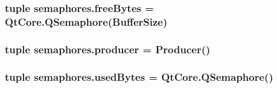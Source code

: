 \subsubsection[{free\+Bytes}]{\setlength{\rightskip}{0pt plus 5cm}tuple semaphores.\+free\+Bytes = Qt\+Core.\+Q\+Semaphore({\bf Buffer\+Size})}\label{namespacesemaphores_a00322f5648ba975dc23e9135233b5194}
\hypertarget{namespacesemaphores_aa6bae6efa5f3a5d078a36acb55002276}{}
\subsubsection[{producer}]{\setlength{\rightskip}{0pt plus 5cm}tuple semaphores.\+producer = {\bf Producer}()}\label{namespacesemaphores_aa6bae6efa5f3a5d078a36acb55002276}
\hypertarget{namespacesemaphores_a6ada4685bc431d22072f34ca03958454}{}
\subsubsection[{used\+Bytes}]{\setlength{\rightskip}{0pt plus 5cm}tuple semaphores.\+used\+Bytes = Qt\+Core.\+Q\+Semaphore()}\label{namespacesemaphores_a6ada4685bc431d22072f34ca03958454}

